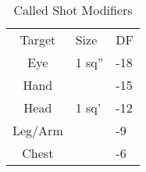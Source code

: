 \begin{table}
	\begin{tabular}{cll}
	Target	& Size & DF\\
	Eye		& 1 sq''& -18 \\
	Hand	&  		& -15 \\
	Head	& 1 sq' & -12 \\
	Leg/Arm & 		& -9 \\
	Chest	& 		& -6  \\
    \end{tabular}
    \caption{Called Shot Modifiers}
\end{table}


